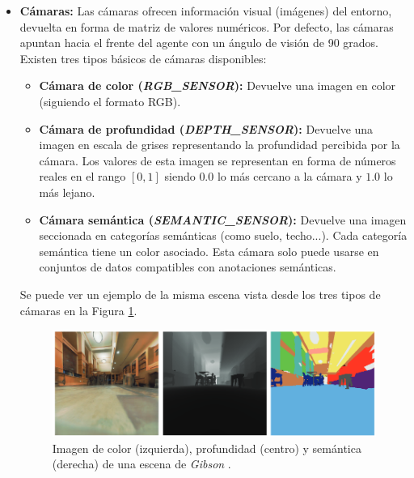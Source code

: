 \begin{itemize}
	\item \textbf{Cámaras:} Las cámaras ofrecen información visual (imágenes) del entorno, devuelta en forma de matriz de valores numéricos. Por defecto, las cámaras apuntan hacia el frente del agente con un ángulo de visión de 90 grados. Existen tres tipos básicos de cámaras disponibles:
	\begin{itemize}
		\item \textbf{Cámara de color (\textit{RGB{\_}SENSOR}):} Devuelve una imagen en color (siguiendo el formato RGB).
		\item \textbf{Cámara de profundidad (\textit{DEPTH{\_}SENSOR}):} Devuelve una imagen en escala de grises representando la profundidad percibida por la cámara. Los valores de esta imagen se representan en forma de números reales en el rango $[0, 1]$ siendo $0.0$ lo más cercano a la cámara y $1.0$ lo más lejano.
		\item \textbf{Cámara semántica (\textit{SEMANTIC{\_}SENSOR}):} Devuelve una imagen seccionada en categorías semánticas (como suelo, techo...). Cada categoría semántica tiene un color asociado. Esta cámara solo puede usarse en conjuntos de datos compatibles con anotaciones semánticas. 
	\end{itemize}
	
	Se puede ver un ejemplo de la misma escena vista desde los tres tipos de cámaras en la Figura \ref{fig:chap4-cameras}.
	
	\begin{figure}[h]
    \centering
    \includegraphics[width=\textwidth]{imagenes/cap4/cameras.png}
    \caption{Imagen de color (izquierda), profundidad (centro) y semántica (derecha) de una escena de \textit{Gibson} \cite{xiazamirhe2018gibsonenv}.}
    \label{fig:chap4-cameras}
\end{figure}		


\end{itemize}
